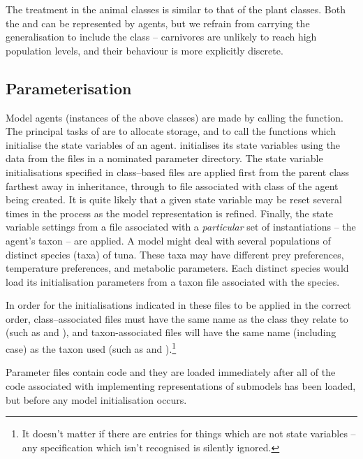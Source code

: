 The treatment in the animal classes is similar to that of the plant
classes. Both the  and  can be represented
by  agents, but we refrain from carrying the
generalisation to include the  class -- carnivores
are unlikely to reach high population levels, and their behaviour is
more explicitly discrete.

\subsection{Parameterisation}

Model agents (instances of the above classes) are made by calling the
 function.  The principal tasks of  are
to allocate storage, and to call the functions which initialise the
state variables of an agent.   initialises its state 
variables using the data from the files in a nominated parameter
directory. The state variable initialisations specified in
class--based files are applied first from the parent class farthest
away in inheritance, through to file associated with class of the
agent being created. It is quite likely that a given state variable
may be reset several times in the process as the model representation
is refined. Finally, the state variable settings from a file
associated with a \emph{particular}\/ set of instantiations -- the
agent's taxon -- are applied.  A model might deal with several
populations of distinct species (taxa) of tuna.  These taxa may have
different prey preferences, temperature preferences, and metabolic
parameters.  Each distinct species would load its initialisation
parameters from a taxon file associated with the species.

In order for the initialisations indicated in these files to be
applied in the correct order, class--associated files must have the
same name as the class they relate to (such as  and
), and taxon-associated files will have the same name
(including case) as the taxon used (such as
 and ).\footnote{It doesn't matter if there are
  entries for things which are not state variables -- any specification
  which isn't recognised is silently ignored.}

Parameter files contain \Scheme code and they are loaded
immediately after all of the code associated with implementing
representations of submodels has been loaded, but before any model
initialisation occurs. 

